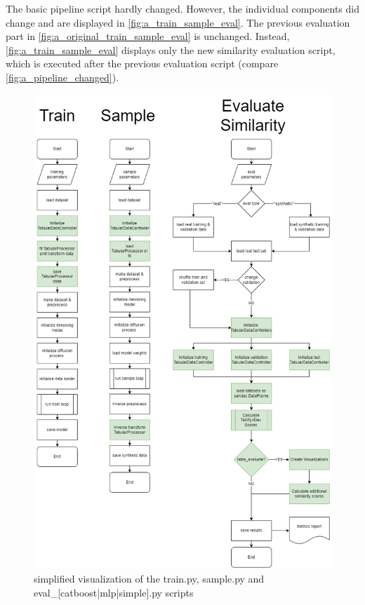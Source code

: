 The basic pipeline script hardly changed.
However, the individual components did change and are displayed in \autoref{fig:a_train_sample_eval}.
The previous evaluation part in \autoref{fig:a_original_train_sample_eval} is unchanged.
Instead,  \autoref{fig:a_train_sample_eval} displays only the new similarity evaluation script, which is
executed after the previous evaluation script (compare \autoref{fig:a_pipeline_changed}).
\begin{figure}
	\centering
	\includegraphics[width=\textwidth]{images/train-sample-eval-Changed.png}
	\caption{simplified visualization of the train.py, sample.py and eval\_[catboost|mlp|simple].py scripts}
	\label{fig:a_train_sample_eval}
\end{figure}
